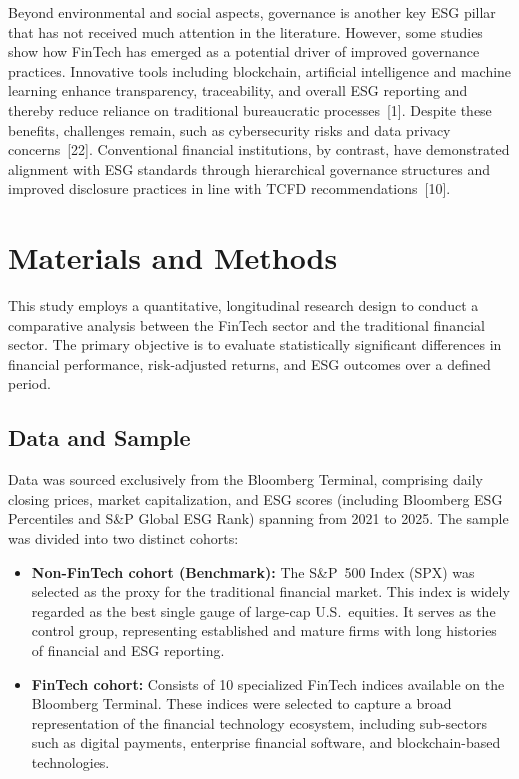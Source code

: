 \documentclass[12pt]{article}
\begin{document}
Beyond environmental and social aspects, governance is another key ESG pillar that has not received much attention in the literature. However, some studies show how FinTech has emerged as a potential driver of improved governance practices. Innovative tools including blockchain, artificial intelligence and machine learning enhance transparency, traceability, and overall ESG reporting and thereby reduce reliance on traditional bureaucratic processes~[1]. Despite these benefits, challenges remain, such as cybersecurity risks and data privacy concerns~[22]. Conventional financial institutions, by contrast, have demonstrated alignment with ESG standards through hierarchical governance structures and improved disclosure practices in line with TCFD recommendations~[10].

\section{Materials and Methods}\label{sec:method}
This study employs a quantitative, longitudinal research design to conduct a comparative analysis between the FinTech sector and the traditional financial sector. The primary objective is to evaluate statistically significant differences in financial performance, risk-adjusted returns, and ESG outcomes over a defined period.

\subsection{Data and Sample}
Data was sourced exclusively from the Bloomberg Terminal, comprising daily closing prices, market capitalization, and ESG scores (including Bloomberg ESG Percentiles and S\&P Global ESG Rank) spanning from 2021 to 2025. The sample was divided into two distinct cohorts:

\begin{itemize}
    \item \textbf{Non-FinTech cohort (Benchmark):} The S\&P~500 Index (SPX) was selected as the proxy for the traditional financial market. This index is widely regarded as the best single gauge of large-cap U.S.\ equities. It serves as the control group, representing established and mature firms with long histories of financial and ESG reporting.
    \item \textbf{FinTech cohort:} Consists of 10 specialized FinTech indices available on the Bloomberg Terminal. These indices were selected to capture a broad representation of the financial technology ecosystem, including sub-sectors such as digital payments, enterprise financial software, and blockchain-based technologies.
\end{itemize}
\end{document}
